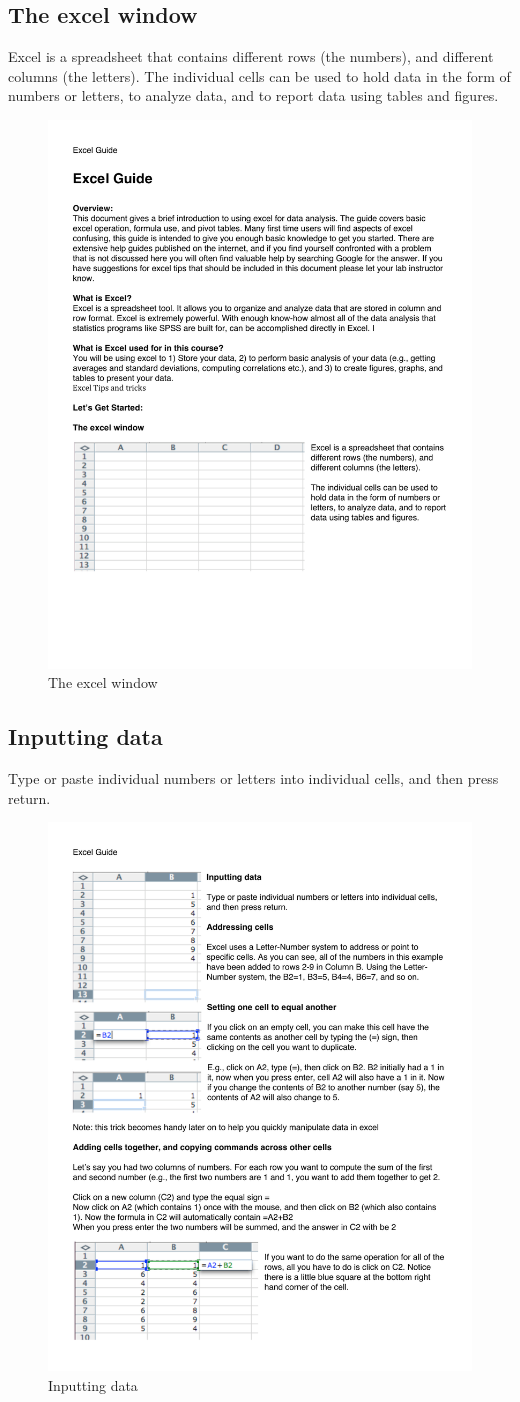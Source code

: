 \subsection{The excel window}
 
Excel is a spreadsheet that contains different rows (the numbers), and different columns (the letters).
The individual cells can be used to hold data in the form of numbers or letters, to analyze data, and to report data using tables and figures.

\begin{figure}
      \includegraphics[width=.7\linewidth]{LabmanualFigures/Excel1.pdf}
      \caption{The excel window}
      \label{fig:excelwindow}
\end{figure}

\subsection{Inputting data}

Type or paste individual numbers or letters into individual cells, and then press return.

\begin{figure}
      \includegraphics[width=.5\linewidth]{LabmanualFigures/Excel2.pdf}
      \caption{Inputting data}
      \label{fig:excel2}
\end{figure}

